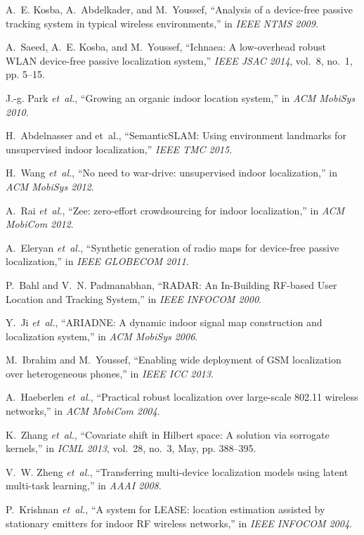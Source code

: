 \documentclass[conference]{IEEEtran}
\begin{document}
\begin{thebibliography}{10}
A.~E. Kosba, A.~Abdelkader, and M.~Youssef, ``Analysis of a device-free passive
  tracking system in typical wireless environments,'' in \emph{IEEE NTMS 2009}.

A.~Saeed, A.~E. Kosba, and M.~Youssef, ``Ichnaea: A low-overhead robust {WLAN}
  device-free passive localization system,'' \emph{IEEE JSAC 2014}, vol.~8,
  no.~1, pp. 5--15.

J.-g. Park \emph{et~al.}, ``Growing an organic indoor location system,'' in
  \emph{ACM MobiSys 2010}.

H.~Abdelnasser and et~al., ``{SemanticSLAM}: Using environment landmarks for
  unsupervised indoor localization,'' \emph{IEEE TMC 2015}.

H.~Wang \emph{et~al.}, ``No need to war-drive: unsupervised indoor
  localization,'' in \emph{ACM MobiSys 2012}.

A.~Rai \emph{et~al.}, ``Zee: zero-effort crowdsourcing for indoor
  localization,'' in \emph{ACM MobiCom 2012}.

A.~Eleryan \emph{et~al.}, ``Synthetic generation of radio maps for device-free
  passive localization,'' in \emph{IEEE GLOBECOM 2011}.

P.~Bahl and V.~N. Padmanabhan, ``{RADAR: An In-Building {RF}-based User
  Location and Tracking System},'' in \emph{IEEE INFOCOM 2000}.

Y.~Ji \emph{et~al.}, ``{ARIADNE}: A dynamic indoor signal map construction and
  localization system,'' in \emph{ACM MobiSys 2006}.

M.~Ibrahim and M.~Youssef, ``Enabling wide deployment of {GSM} localization
  over heterogeneous phones,'' in \emph{IEEE ICC 2013}.

A.~Haeberlen \emph{et~al.}, ``Practical robust localization over large-scale
  802.11 wireless networks,'' in \emph{ACM MobiCom 2004}.

K.~Zhang \emph{et~al.}, ``Covariate shift in {H}ilbert space: A solution via
  sorrogate kernels,'' in \emph{ICML 2013}, vol.~28, no.~3, May, pp. 388--395.

V.~W. Zheng \emph{et~al.}, ``Transferring multi-device localization models
  using latent multi-task learning,'' in \emph{AAAI 2008}.

P.~Krishnan \emph{et~al.}, ``A system for {LEASE}: location estimation assisted
  by stationary emitters for indoor {RF} wireless networks,'' in \emph{IEEE
  INFOCOM 2004}.


\end{thebibliography}
\end{document}
